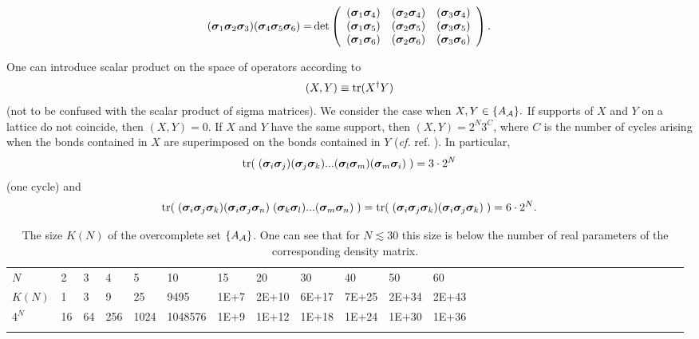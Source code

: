 \documentclass[a4paper]{jpconf}
\renewcommand\[{\begin{equation}}
\renewcommand\]{\end{equation}}
\newcommand{\ssigma}{{\bm \sigma}}
\newcommand{\A}{{\cal A}}
\begin{document}
\[{\rm{(}}{{\ssigma}_1}{{\ssigma}_2}{{\ssigma}_3}{\rm{)(}}{{\ssigma}_4}{{\ssigma}_5}{{\ssigma}_6}{\rm{) = }}\det \left( {\begin{array}{*{20}{c}}
	{{\rm{(}}{{\ssigma}_1}{{\ssigma}_4}{\rm{)}}}&{{\rm{(}}{{\ssigma}_2}{{\ssigma}_4}{\rm{)}}}&{{\rm{(}}{{\ssigma}_3}{{\ssigma}_4}{\rm{)}}}\\
	{{\rm{(}}{{\ssigma}_1}{{\ssigma}_5}{\rm{)}}}&{{\rm{(}}{{\ssigma}_2}{{\ssigma}_5}{\rm{)}}}&{{\rm{(}}{{\ssigma}_3}{{\ssigma}_5}{\rm{)}}}\\
	{{\rm{(}}{{\ssigma}_1}{{\ssigma}_6}{\rm{)}}}&{{\rm{(}}{{\ssigma}_2}{{\ssigma}_6}{\rm{)}}}&{{\rm{(}}{{\ssigma}_3}{{\ssigma}_6}{\rm{)}}}
	\end{array}} \right)
\label{mixeddet}
.\]

One can introduce scalar product on the space of operators according to
\[(X,Y) \equiv \mathop{\rm{tr}}(X^\dagger Y) \]
(not to be confused with the scalar product of sigma matrices).
We consider the case when $X,Y\in \{A_\A\}.$ If supports of $X$ and $Y$ on a lattice do not coincide, then $(X,Y) = 0$.
If $X$ and $Y$ have the same support, then $\left( {X,Y} \right) = {2^N}{3^C}$,
where  $C$ is the number of cycles  arising when the bonds contained in $X$ are superimposed on the bonds contained in $Y$ ({\it cf.} ref. \cite{BeachSandvik}). In particular,
\[{\rm{tr}}(\;({{\ssigma}_i}{{\ssigma}_j})({{\ssigma}_j}{{\ssigma}_k})...({{\ssigma}_l}{{\ssigma}_m})({{\ssigma}_m}{{\ssigma}_i})\;) = 3 \cdot {2^N}\]
(one cycle) and
\[
{\rm{tr}}(\;({{\ssigma}_i}{{\ssigma}_j}{{\ssigma}_k})({{\ssigma}_i}{{\ssigma}_j}{{\ssigma}_n})\;({{\ssigma}_k}{{\ssigma}_l})...({{\ssigma}_m}{{\ssigma}_n})\;) =
{\rm{tr}}(\;({{\ssigma}_i}{{\ssigma}_j}{{\ssigma}_k})({{\ssigma}_i}{{\ssigma}_j}{{\ssigma}_k})\;) = 6 \cdot {2^N}.
\]

\begin{table}[t]
	\caption{\label{KN}The size $K(N)$ of the overcomplete set $\{A_\A\}$. One can see that for $N\lesssim 30$ this size is below the number of real parameters of the corresponding density matrix. }
	\begin{center}
		\begin{tabular}{lllllllllllllllllllllllllllllll}
			\br
			$N$&2 &3 &4 &5 &10 &15 &20 &30 &40 &50 &60 \\
			\mr
			$K(N)$&1 &3 &9 &25 &9495 &1E+7 &2E+10 &6E+17 &7E+25 &2E+34 &2E+43 \\
			$4^N$&16&64&256&1024&1048576&1E+9&1E+12&1E+18&1E+24&1E+30&1E+36\\
			\br
		\end{tabular}
	\end{center}
\end{table}
\end{document}
